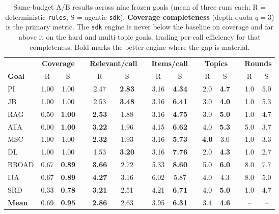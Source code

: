 \documentclass[conference]{IEEEtran}
\newcommand{\code}[1]{\texttt{\small #1}}
\begin{document}
\begin{table}[t]
\centering
\caption{Same-budget A/B results across nine frozen goals (mean of three runs each; R = deterministic \code{rules}, S = agentic \code{sdk}). \textbf{Coverage completeness} (depth quota $q=3$) is the primary metric. The \code{sdk} engine is never below the baseline on coverage and far above it on the hard and multi-topic goals, trading per-call efficiency for that completeness. Bold marks the better engine where the gap is material.}
\label{tab:ab}
\renewcommand{\arraystretch}{1.15}
\setlength{\tabcolsep}{4.5pt}
\begin{tabular}{@{}l cc c cc c cc c cc c cc@{}}
\toprule
& \multicolumn{2}{c}{\textbf{Coverage}} && \multicolumn{2}{c}{\textbf{Relevant/call}} && \multicolumn{2}{c}{\textbf{Items/call}} && \multicolumn{2}{c}{\textbf{Topics}} && \multicolumn{2}{c}{\textbf{Rounds}} \\
\cmidrule{2-3}\cmidrule{5-6}\cmidrule{8-9}\cmidrule{11-12}\cmidrule{14-15}
\textbf{Goal} & R & S && R & S && R & S && R & S && R & S \\
\midrule
PI    & 1.00 & 1.00 && 2.47 & \textbf{2.83} && 3.16 & \textbf{4.34} && 2.0 & \textbf{4.7} && 1.0 & 5.0 \\
JB    & 1.00 & 1.00 && 2.53 & \textbf{3.48} && 3.16 & \textbf{6.41} && 3.0 & \textbf{4.0} && 1.0 & 5.3 \\
RAG   & 0.50 & \textbf{1.00} && \textbf{2.53} & 1.88 && 3.16 & \textbf{4.75} && 3.0 & \textbf{5.0} && 1.0 & 4.7 \\
ATA   & 0.00 & \textbf{1.00} && \textbf{3.22} & 1.96 && 4.15 & \textbf{6.62} && 4.0 & \textbf{5.3} && 5.0 & 3.7 \\
MSC   & 1.00 & 1.00 && \textbf{2.32} & 1.93 && 3.16 & \textbf{5.73} && \textbf{4.0} & 3.0 && 1.0 & 3.3 \\
DL    & 1.00 & 1.00 && 1.53 & \textbf{3.20} && 3.16 & \textbf{7.76} && 2.0 & \textbf{4.3} && 1.0 & 2.7 \\
BROAD & 0.67 & \textbf{0.89} && \textbf{3.66} & 2.72 && 5.33 & \textbf{8.60} && 5.0 & \textbf{6.0} && 8.0 & 7.7 \\
IJA   & 0.67 & \textbf{0.89} && \textbf{4.27} & 3.16 && 6.02 & 5.87 && 4.0 & 4.3 && 8.0 & 5.0 \\
SRD   & 0.33 & \textbf{0.78} && \textbf{3.21} & 2.51 && 4.21 & \textbf{6.71} && 4.0 & \textbf{5.0} && 1.0 & 4.7 \\
\midrule
\textbf{Mean} & 0.69 & \textbf{0.95} && \textbf{2.86} & 2.63 && 3.95 & \textbf{6.31} && 3.4 & \textbf{4.6} && -- & -- \\
\bottomrule
\end{tabular}
\end{table}
\end{document}
